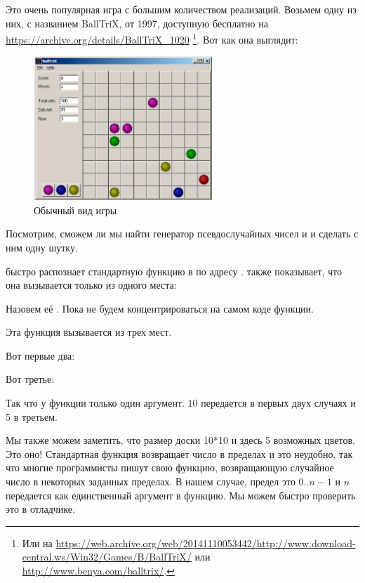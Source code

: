 ﻿\clearpage
{}
\label{chap:color_lines}

Это очень популярная игра с большим количеством реализаций.
Возьмем одну из них, с названием BallTriX, от 1997, доступную бесплатно на \url{https://archive.org/details/BallTriX_1020}
\footnote{Или на \url{https://web.archive.org/web/20141110053442/http://www.download-central.ws/Win32/Games/B/BallTriX/} или \url{http://www.benya.com/balltrix/}.}.
Вот как она выглядит:

\begin{figure}[H]
\centering
\includegraphics[width=0.6\textwidth]{examples/lines/1.png}
\caption{Обычный вид игры}
\label{fig:lines_1}
\end{figure}

\clearpage
{}
Посмотрим, сможем ли мы найти генератор псевдослучайных чисел и и сделать с ним одну шутку.

\IDA быстро распознает стандартную функцию  в 
 по адресу .
\IDA также показывает, что она вызывается только из одного места:



Назовем её .
Пока не будем концентрироваться на самом коде функции.

Эта функция вызывается из трех мест.

Вот первые два:



Вот третье:



Так что у функции только один аргумент.
10 передается в первых двух случаях и 5 в третьем.

Мы также можем заметить, что размер доски 10*10 и здесь 5 возможных цветов.
Это оно!
Стандартная функция  возвращает число в пределах  и это неудобно, так что многие программисты пишут свою функцию,
возвращающую случайное число в некоторых заданных пределах.
В нашем случае, предел это $0..n-1$ и $n$ передается как
единственный аргумент в функцию.
Мы можем быстро проверить это в отладчике.

